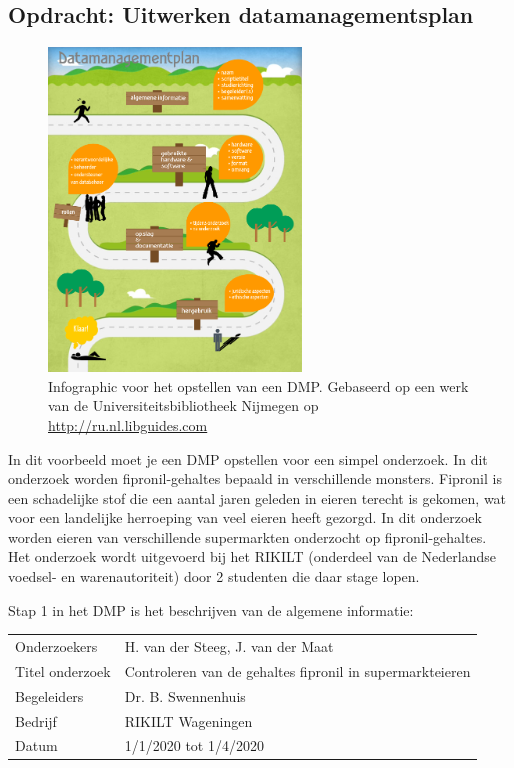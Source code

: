\subsection*{Opdracht: Uitwerken datamanagementsplan}
\begin{figure}[h]
\begin{center}
\includegraphics[width=0.6\textwidth]{img/dpm_studenten_infographic.png}
\caption{\label{fig:dmpinfo} \small Infographic voor het opstellen van een DMP. Gebaseerd op een werk van de Universiteitsbibliotheek Nijmegen op \href{http://ru.nl.libguides.com}{\textsf{http://ru.nl.libguides.com}}}
\end{center}
\end{figure}

In dit voorbeeld moet je een DMP opstellen voor een simpel onderzoek. In dit onderzoek worden fipronil-gehaltes bepaald in verschillende monsters. Fipronil is een schadelijke stof die een aantal jaren geleden in eieren terecht is gekomen, wat voor een landelijke herroeping van veel eieren heeft gezorgd. In dit onderzoek worden eieren van verschillende supermarkten onderzocht op fipronil-gehaltes. Het onderzoek wordt uitgevoerd bij het RIKILT (onderdeel van de Nederlandse voedsel- en warenautoriteit) door 2 studenten die daar stage lopen. 

Stap 1 in het DMP is het beschrijven van de algemene informatie:
\begin{table}[h]
\begin{tabular}{ll}
Onderzoekers    & H. van der Steeg, J. van der Maat                    \\
Titel onderzoek & Controleren van de gehaltes fipronil in supermarkteieren \\
Begeleiders     & Dr. B. Swennenhuis                                   \\
Bedrijf        & RIKILT Wageningen                                       \\
Datum      & 1/1/2020 tot 1/4/2020                                            
\end{tabular}
\end{table}

